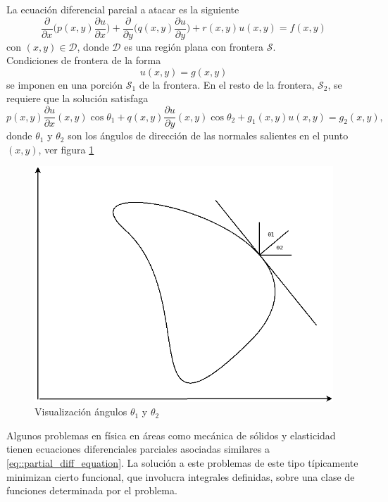 \documentclass[a4paper]{article}
\begin{document}
La ecuación diferencial parcial a atacar es la siguiente
\begin{equation}\label{eq::partial_diff_equation}
\frac{\partial}{\partial x}\Bigg( p(x,y)\frac{\partial u}{\partial x} \Bigg) + \frac{\partial}{\partial y}\Bigg( q(x,y)\frac{\partial u}{\partial y} \Bigg) +r(x,y)u(x,y)=f(x,y)
\end{equation}
con $(x,y)\in \mathcal{D}$, donde $\mathcal{D}$ es una región plana con frontera $\mathcal{S}$.\\

Condiciones de frontera de la forma
\begin{equation}\label{eq::boundary1}
u(x,y)=g(x,y)
\end{equation}
se imponen en una porción $\mathcal{S}_1$ de la frontera. En el resto de la frontera, $\mathcal{S}_2$, se requiere que la solución satisfaga
\begin{equation}\label{eq:boundary2}
p(x,y)\frac{\partial u}{\partial x}(x,y)\cos\theta_1+q(x,y)\frac{\partial u}{\partial y}(x,y)\cos\theta_2+g_1(x,y)u(x,y)=g_2(x,y),
\end{equation}
donde $\theta_1$ y $\theta_2$ son los ángulos de dirección de las normales salientes en el punto $(x,y)$, ver figura \ref{fig::fig1}
\begin{figure}[h]
\begin{center}
\includegraphics[scale=0.42]{./fig1.png} 
\end{center} 
\caption{Visualización ángulos $\theta_1$ y $\theta_2$}
\label{fig::fig1}
\end{figure}
Algunos problemas en física en áreas como mecánica de sólidos y elasticidad tienen ecuaciones diferenciales parciales asociadas similares a \ref{eq::partial_diff_equation}. La solución a este problemas de este tipo típicamente minimizan cierto funcional, que involucra integrales definidas, sobre una clase de funciones determinada por el problema.\\
\end{document}
